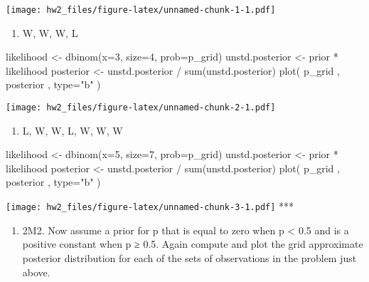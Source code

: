 \documentclass[
]{article}
\newenvironment{Shaded}{\begin{snugshade}}{\end{snugshade}}
\newcommand{\AttributeTok}[1]{\textcolor[rgb]{0.77,0.63,0.00}{#1}}
\newcommand{\DecValTok}[1]{\textcolor[rgb]{0.00,0.00,0.81}{#1}}
\newcommand{\FunctionTok}[1]{\textcolor[rgb]{0.00,0.00,0.00}{#1}}
\newcommand{\NormalTok}[1]{#1}
\newcommand{\OtherTok}[1]{\textcolor[rgb]{0.56,0.35,0.01}{#1}}
\newcommand{\SpecialCharTok}[1]{\textcolor[rgb]{0.00,0.00,0.00}{#1}}
\newcommand{\StringTok}[1]{\textcolor[rgb]{0.31,0.60,0.02}{#1}}
\providecommand{\tightlist}{%
  \setlength{\itemsep}{0pt}\setlength{\parskip}{0pt}}
\begin{document}
\texttt{[image: hw2\_files/figure-latex/unnamed-chunk-1-1.pdf]}

\begin{enumerate}
\def\labelenumi{(\arabic{enumi})}
\setcounter{enumi}{1}
\tightlist
\item
  W, W, W, L
\end{enumerate}

\begin{Shaded}
\begin{Highlighting}[]
\NormalTok{likelihood }\OtherTok{\textless{}{-}} \FunctionTok{dbinom}\NormalTok{(}\AttributeTok{x=}\DecValTok{3}\NormalTok{, }\AttributeTok{size=}\DecValTok{4}\NormalTok{, }\AttributeTok{prob=}\NormalTok{p\_grid)}
\NormalTok{unstd.posterior }\OtherTok{\textless{}{-}}\NormalTok{ prior }\SpecialCharTok{*}\NormalTok{ likelihood}
\NormalTok{posterior }\OtherTok{\textless{}{-}}\NormalTok{ unstd.posterior }\SpecialCharTok{/} \FunctionTok{sum}\NormalTok{(unstd.posterior)}
\FunctionTok{plot}\NormalTok{( p\_grid , posterior , }\AttributeTok{type=}\StringTok{"b"}\NormalTok{ )}
\end{Highlighting}
\end{Shaded}

\texttt{[image: hw2\_files/figure-latex/unnamed-chunk-2-1.pdf]}

\begin{enumerate}
\def\labelenumi{(\arabic{enumi})}
\setcounter{enumi}{2}
\tightlist
\item
  L, W, W, L, W, W, W
\end{enumerate}

\begin{Shaded}
\begin{Highlighting}[]
\NormalTok{likelihood }\OtherTok{\textless{}{-}} \FunctionTok{dbinom}\NormalTok{(}\AttributeTok{x=}\DecValTok{5}\NormalTok{, }\AttributeTok{size=}\DecValTok{7}\NormalTok{, }\AttributeTok{prob=}\NormalTok{p\_grid)}
\NormalTok{unstd.posterior }\OtherTok{\textless{}{-}}\NormalTok{ prior }\SpecialCharTok{*}\NormalTok{ likelihood}
\NormalTok{posterior }\OtherTok{\textless{}{-}}\NormalTok{ unstd.posterior }\SpecialCharTok{/} \FunctionTok{sum}\NormalTok{(unstd.posterior)}
\FunctionTok{plot}\NormalTok{( p\_grid , posterior , }\AttributeTok{type=}\StringTok{"b"}\NormalTok{ )}
\end{Highlighting}
\end{Shaded}

\texttt{[image: hw2\_files/figure-latex/unnamed-chunk-3-1.pdf]} ***

\begin{enumerate}
\def\labelenumi{\Alph{enumi})}
\setcounter{enumi}{16}
\tightlist
\item
  2M2. Now assume a prior for p that is equal to zero when p \textless{}
  0.5 and is a positive constant when p ≥ 0.5. Again compute and plot
  the grid approximate posterior distribution for each of the sets of
  observations in the problem just above.
\end{enumerate}
\end{document}
